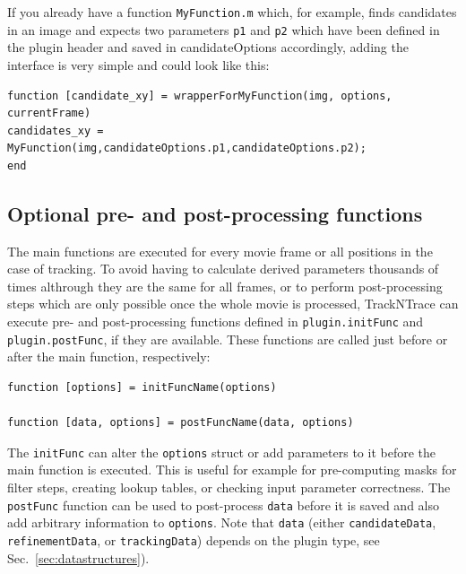 \documentclass[11pt,onside]{report}
\numberwithin{equation}{chapter}
\begin{document}
If you already have a function \texttt{MyFunction.m} which, for example, finds candidates in an image and expects two parameters \texttt{p1} and \texttt{p2} which have been defined in the plugin header and saved in candidateOptions accordingly, adding the interface is very simple and could look like this:
\begin{lstlisting}[style=Matlab-editor]
function [candidate_xy] = wrapperForMyFunction(img, options, currentFrame)
candidates_xy = MyFunction(img,candidateOptions.p1,candidateOptions.p2);
end
\end{lstlisting}

\subsection{Optional pre- and post-processing functions}
The main functions are executed for every movie frame or all positions in the case of tracking. To avoid having to calculate derived parameters thousands of times althrough they are the same for all frames, or to perform post-processing steps which are only possible once the whole movie is processed, TrackNTrace can execute pre- and post-processing functions defined in \texttt{plugin.initFunc} and \texttt{plugin.postFunc}, if they are available. These functions are called just before or after the main function, respectively:
\begin{lstlisting}[style=Matlab-editor]
function [options] = initFuncName(options)

function [data, options] = postFuncName(data, options)
\end{lstlisting}
The \texttt{initFunc} can alter the \texttt{options} struct or add parameters to it before the main function is executed. This is useful for example for pre-computing masks for filter steps, creating lookup tables, or checking input parameter correctness. The \texttt{postFunc} function can be used to post-process \texttt{data} before it is saved and also add arbitrary information to \texttt{options}. Note that \texttt{data} (either \texttt{candidateData}, \texttt{refinementData}, or \texttt{trackingData}) depends on the plugin type, see Sec.~\ref{sec:datastructures}). 
\end{document}
